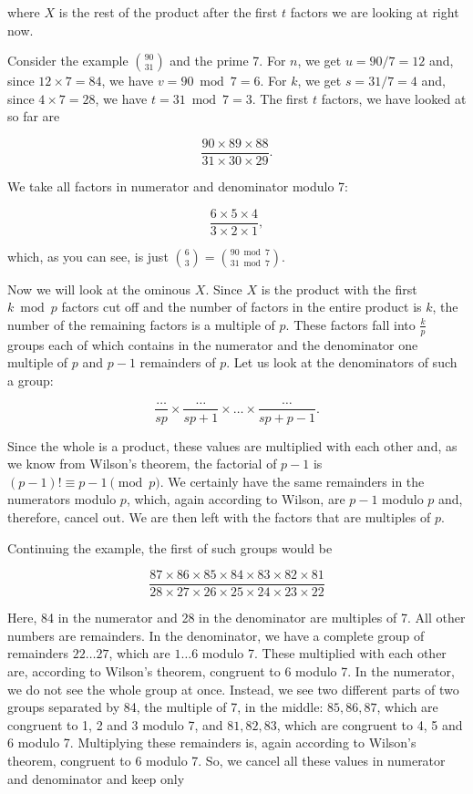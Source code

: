\documentclass[tikz]{scrreprt}
\begin{document}
where $X$ is the rest of the product after 
the first $t$ factors we are looking at right now.

Consider the example $\binom{90}{31}$ and
the prime 7. For $n$, we get
$u = 90 / 7 = 12$ and, since $12 \times 7 = 84$,
we have $v = 90 \bmod 7 = 6$.
For $k$, we get
$s = 31 / 7 = 4$ and, since $4 \times 7 = 28$,
we have $t = 31 \bmod 7 = 3$.
The first $t$ factors, we have looked at so far
are

\[
\frac{90 \times 89 \times 88}{31 \times 30 \times 29}.
\]

We take all factors in numerator
and denominator modulo 7:

\[
\frac{6 \times 5 \times 4}{3 \times 2 \times 1},
\]

which, as you can see, is just
$\binom{6}{3} = \binom{90 \bmod 7}{31 \bmod 7}$.

Now we will look at the ominous $X$.
Since $X$ is the product with the first
$k \bmod p$ factors cut off and
the number of factors in the entire product is $k$,
the number of the remaining factors 
is a multiple of $p$.
These factors fall into $\frac{k}{p}$ groups
each of which contains 
in the numerator and the denominator
one multiple of $p$ and $p-1$ remainders of $p$.
Let us look at the denominators of such a group: 

\[
\frac{\dots}{sp} \times \frac{\dots}{sp+1} \times \dots \times
\frac{\dots}{sp+p-1}.
\]

Since the whole is a product,
these values are multiplied with each other
and, as we know from Wilson's theorem,
the factorial of $p-1$ is $(p-1)! \equiv p-1 \pmod{p}$.
We certainly have the same remainders in the numerators
modulo $p$, which, again according to Wilson,
are $p-1$ modulo $p$ and, therefore, cancel out.
We are then left with the factors that are multiples
of $p$.

Continuing the example, the first of such groups would be

\[
\frac{87 \times 86 \times 85 \times 84 \times 83 \times 82 \times 81}
     {28 \times 27 \times 26 \times 25 \times 24 \times 23 \times 22}
\]

Here, 84 in the numerator and 28 in the denominator are 
multiples of 7. All other numbers are remainders.
In the denominator, we have a complete group of remainders
$22\dots 27$, which are $1\dots 6$ modulo 7.
These multiplied with each other are,
according to Wilson's theorem, congruent to 6 modulo 7.
In the numerator, we do not see the whole group at once.
Instead, we see two different parts of two groups
separated by 84, the multiple of 7, in the middle:
$85,86,87$, which are congruent to 1, 2 and 3 modulo 7,
and $81,82,83$, which are congruent to 4, 5 and 6 modulo 7.
Multiplying these remainders is, again
according to Wilson's theorem, congruent to 6 modulo 7.
So, we cancel all these values in numerator and denominator
and keep only
\end{document}
